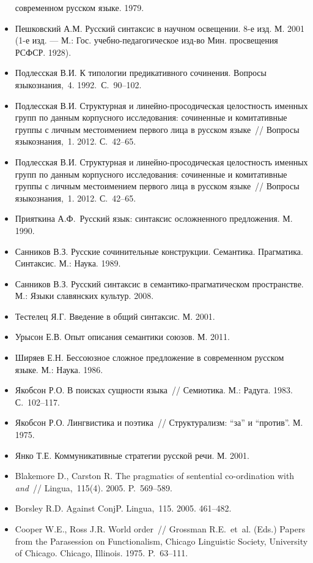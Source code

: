 \begin{itemize}
  современном русском языке. 1979.
\item
  Пешковский А.М. Русский синтаксис в научном освещении. 8-е изд. М.
  2001 (1-е изд. --- М.: Гос. учебно-педагогическое изд-во Мин.
  просвещения РСФСР. 1928).
\item
  Подлесская В.И. К типологии предикативного сочинения. Вопросы
  языкознания,~4. 1992.~С.~90--102.
\item
  Подлесская В.И. Структурная и линейно-просодическая целостность
  именных групп по данным корпусного исследования: сочиненные и
  комитативные группы с личным местоимением первого лица в русском
  языке~// Вопросы языкознания,~1. 2012. С.~42--65.
\item
  Подлесская В.И. Структурная и линейно-просодическая целостность
  именных групп по данным корпусного исследования: сочиненные и
  комитативные группы с личным местоимением первого лица в русском
  языке~// Вопросы языкознания,~1. 2012. С.~42--65.
\item
  Прияткина А.Ф.~Русский язык: синтаксис осложненного предложения. М.
  1990.
\item
  Санников В.З. Русские сочинительные конструкции. Семантика.
  Прагматика. Синтаксис. М.: Наука. 1989.
\item
  Санников В.З. Русский синтаксис в семантико-прагматическом
  пространстве. М.: Языки славянских культур. 2008.
\item
  Тестелец Я.Г. Введение в общий синтаксис. М. 2001.
\item
  Урысон Е.В. Опыт описания семантики союзов. М. 2011.
\item
  Ширяев Е.Н. Бессоюзное сложное предложение в современном русском
  языке. М.: Наука. 1986.
\item
  Якобсон Р.О. В поисках сущности языка~// Семиотика. М.: Радуга. 1983.
  С.~102--117.
\item
  Якобсон Р.О. Лингвистика и поэтика~// Структурализм: ``за'' и
  ``против''. М. 1975.
\item
  Янко Т.Е. Коммуникативные стратегии русской речи. М. 2001.
\item
  Blakemore D., Carston R. The pragmatics of sentential co-ordination
  with \textit{and}~// Lingua,~115(4). 2005. P.~569--589.
\item
  Borsley R.D. Against ConjP. Lingua,~115. 2005. 461--482.
\item
  Cooper W.E., Ross J.R. World order~// Grossman R.E.~et~al. (Eds.)
  Papers from the Parasession on Functionalism, Chicago Linguistic
  Society, University of Chicago. Chicago, Illinois. 1975. P.~63--111.

\end{itemize}
